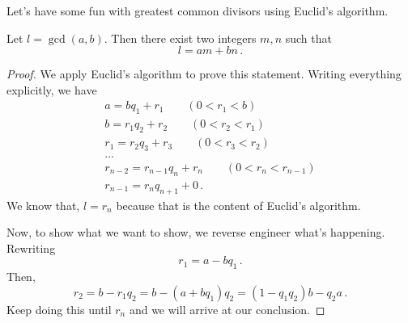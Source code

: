 Let's have some fun with greatest common divisors using Euclid's algorithm.
\begin{corollary}
    Let $l = \gcd(a,b)$. Then there exist two integers $m,n$ such that
    \begin{equation*}
        l = am + bn\,.
    \end{equation*}
\end{corollary}
\begin{proof}
   We apply Euclid's algorithm to prove this statement. 
   Writing everything explicitly, we have
   \begin{gather*}
       a = bq_1 + r_1 \qquad ( 0< r_1 < b)\\ 
       b = r_1q_2 + r_2 \qquad ( 0< r_2 < r_1)\\ 
       r_1 = r_2 q_3 + r_3 \qquad ( 0< r_3 < r_2) \\
       \dots \\
       r_{n-2} = r_{n-1} q_{n} + r_n \qquad ( 0< r_n < r_{n-1}) \\
       r_{n-1} = r_n q_{n+1} + 0  \,.
   \end{gather*}
   We know that, $l = r_n$ because that is the content of Euclid's algorithm.

   Now, to show what we want to show, we reverse engineer what's happening.
    Rewriting 
    \begin{equation*}
        r_1 = a - bq_1\,.
    \end{equation*}
    Then,
    \begin{equation*}
        r_2 = b - r_1 q_2 = b - (a + b q_1)q_2 = (1 - q_1q_2) b - q_2 a \,.
    \end{equation*}
    Keep doing this until $r_n$ and we will arrive at our conclusion.
\end{proof}

